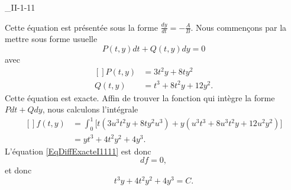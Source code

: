 \begin{corrige}{_II-1-11}
\begin{enumerate}
Cette équation est présentée sous la forme $\frac{ dy }{ dt }=-\frac{ A }{ B }$. Nous commençons par la mettre sous forme usuelle
\begin{equation}	\label{EqDiffExacteI1111}
	P(t,y)dt+Q(t,y)dy=0
\end{equation}
avec
\begin{equation}
	\begin{aligned}[]
		P(t,y)	&=3t^2y+8ty^2\\
		Q(t,y)	&=t^3+8t^2y+12y^2.
	\end{aligned}
\end{equation}
Cette équation est exacte. Affin de trouver la fonction qui intègre la forme $Pdt+Qdy$, nous calculons l'intégrale
\begin{equation}
	\begin{aligned}[]
		f(t,y)	&=\int_0^1\big[ t(3u^3t^2y+8ty^2u^3)+y(u^3t^3+8u^3t^2y+12u^2y^2) \big]\\
			&=yt^3+4t^2y^2+4y^3.
	\end{aligned}
\end{equation}
L'équation \eqref{EqDiffExacteI1111} est donc
\begin{equation}
	df=0,
\end{equation}
et donc
\begin{equation}
	t^3y+4t^2y^2+4y^3=C.
\end{equation}

\end{enumerate}


\end{corrige}
